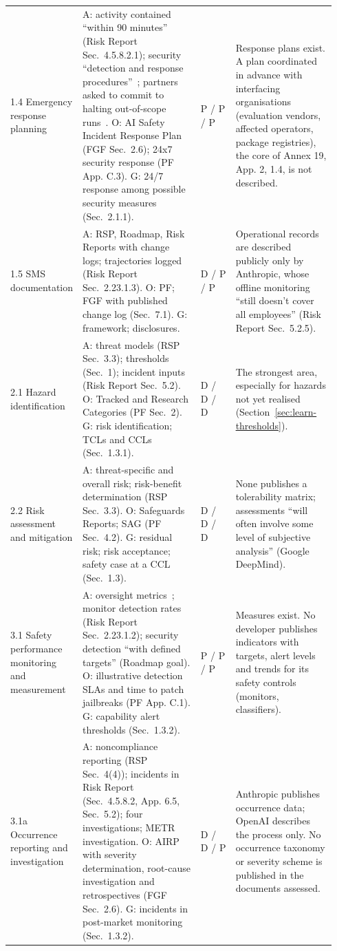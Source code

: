 \documentclass[11pt]{article}
\begin{document}
{\begin{longtable}{@{}>{\raggedright\arraybackslash}p{0.14\linewidth}>{\raggedright\arraybackslash}p{0.375\linewidth}>{\centering\arraybackslash}p{0.115\linewidth}>{\raggedright\arraybackslash}p{0.31\linewidth}@{}}
\addlinespace[2pt]
{}1.4 Emergency response planning & A: activity contained ``within 90 minutes'' (Risk Report Sec.~4.5.8.2.1); security ``detection and response procedures''~\cite{anthropic2026unintended}; partners asked to commit to halting out-of-scope runs~\cite{anthropic2026improving}. O: AI Safety Incident Response Plan (FGF Sec.~2.6); 24x7 security response (PF App. C.3). G: 24/7 response among possible security measures (Sec.~2.1.1). & P / P / P & Response plans exist. A plan coordinated in advance with interfacing organisations (evaluation vendors, affected operators, package registries), the core of Annex 19, App. 2, 1.4, is not described. \\
\addlinespace[2pt]
{}1.5 SMS documentation & A: RSP, Roadmap, Risk Reports with change logs; trajectories logged (Risk Report Sec.~2.23.1.3). O: PF; FGF with published change log (Sec.~7.1). G: framework; disclosures. & D / P / P & Operational records are described publicly only by Anthropic, whose offline monitoring ``still doesn't cover all employees'' (Risk Report Sec.~5.2.5). \\
\addlinespace[2pt]
{}2.1 Hazard identification & A: threat models (RSP Sec.~3.3); thresholds (Sec.~1); incident inputs (Risk Report Sec.~5.2). O: Tracked and Research Categories (PF Sec.~2). G: risk identification; TCLs and CCLs (Sec.~1.3.1). & D / D / D & The strongest area, especially for hazards not yet realised (Section~\ref{sec:learn-thresholds}). \\
\addlinespace[2pt]
{}2.2 Risk assessment and mitigation & A: threat-specific and overall risk; risk-benefit determination (RSP Sec.~3.3). O: Safeguards Reports; SAG (PF Sec.~4.2). G: residual risk; risk acceptance; safety case at a CCL (Sec.~1.3). & D / D / D & None publishes a tolerability matrix; assessments ``will often involve some level of subjective analysis'' (Google DeepMind). \\
\addlinespace[2pt]
{}3.1 Safety performance monitoring and measurement & A: oversight metrics~\cite{favaro2026}; monitor detection rates (Risk Report Sec.~2.23.1.2); security detection ``with defined targets'' (Roadmap goal). O: illustrative detection SLAs and time to patch jailbreaks (PF App. C.1). G: capability alert thresholds (Sec.~1.3.2). & P / P / P & Measures exist. No developer publishes indicators with targets, alert levels and trends for its safety controls (monitors, classifiers). \\
\addlinespace[2pt]
{}3.1a Occurrence reporting and investigation & A: noncompliance reporting (RSP Sec.~4(4)); incidents in Risk Report (Sec.~4.5.8.2, App. 6.5, Sec.~5.2); four investigations; METR investigation. O: AIRP with severity determination, root-cause investigation and retrospectives (FGF Sec.~2.6). G: incidents in post-market monitoring (Sec.~1.3.2). & D / D / P & Anthropic publishes occurrence data; OpenAI describes the process only. No occurrence taxonomy or severity scheme is published in the documents assessed. \\

\end{longtable}}
\end{document}
